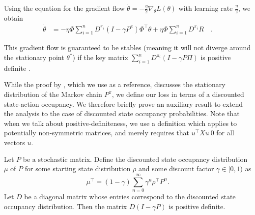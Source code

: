 Using the equation for the gradient flow $\dot{\theta} = - \frac{\eta}{2} \nabla_\theta L(\theta)$ with learning rate $\frac{\eta}{2}$, we obtain
\begin{align}
    \dot\theta &= - \eta \Phi \sum_{i=1}^n D^{\pi_i} \left(I - \gamma P^\pi \right)\Phi^\top \theta + \eta \Phi \sum_{i=1}^n D^{\pi_i} R\quad.
\end{align}

This gradient flow is guaranteed to be stables (meaning it will not diverge around the stationary point $\theta^*$) if the key matrix $\sum_{i=1}^n D^{\pi_i} \left(I - \gamma P \Pi \right)$ is positive definite \textcite{sutton1988learning}. 

While the proof by \textcite{sutton1988learning}, which we use as a reference, discusses the stationary distribution of the Markov chain $P^\pi$, we define our loss in terms of a discounted state-action occupancy. 
We therefore briefly prove an auxiliary result to extend the analysis to the case of discounted state occupancy probabilities.
Note that when we talk about positive-definiteness, we use a definition which applies to potentially non-symmetric matrices, and merely requires that $u^\top X u \> 0$ for all vectors $u$.


\begin{proposition}
\label{prop:aux}
Let $P$ be a stochastic matrix. Define the discounted state occupancy distribution $\mu$ of $P$ for some starting state distribution $\rho$ and some discount factor $\gamma \in [0,1)$ as $$\mu^\top = (1 - \gamma) \sum_{n=0}^\infty \gamma^n \rho^\top P^n.$$ Let $D$ be a diagonal matrix whose entries correspond to the discounted state occupancy distribution.
Then the matrix $D(I - \gamma P)$ is positive definite.
\end{proposition}

